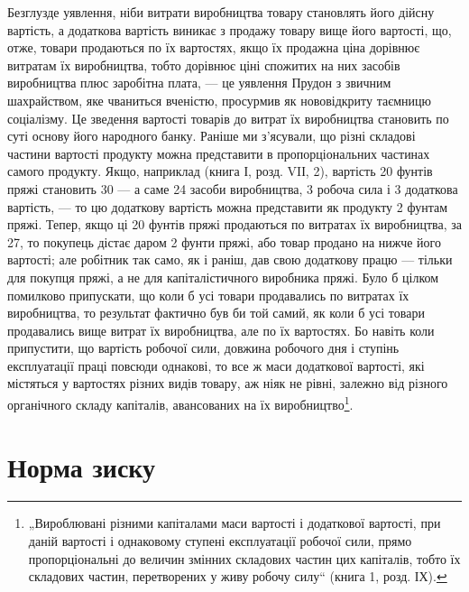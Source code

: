 
Безглузде уявлення, ніби витрати виробництва товару становлять
його дійсну вартість, а додаткова вартість виникає
з продажу товару вище його вартості, що, отже, товари продаються
по їх вартостях, якщо їх продажна ціна дорівнює витратам
їх виробництва, тобто дорівнює ціні спожитих на них
засобів виробництва плюс заробітна плата, — це уявлення Прудон
з звичним шахрайством, яке чваниться вченістю, просурмив
як нововідкриту таємницю соціалізму. Це зведення вартості
товарів до витрат їх виробництва становить по суті
основу його народного банку. Раніше ми з’ясували, що різні складові
частини вартості продукту можна представити в пропорціональних
частинах самого продукту. Якщо, наприклад (книга І,
розд. VIІ, 2), вартість 20 фунтів пряжі становить
30 — а саме 24 засоби виробництва, 3
робоча сила і 3 додаткова вартість, — то цю додаткову
вартість можна представити як  продукту \deq{} 2 фунтам пряжі.
Тепер, якщо ці 20 фунтів пряжі продаються по витратах їх
виробництва, за 27, то покупець дістає даром 2 фунти
пряжі, або товар продано на   нижче його вартості; але робітник
так само, як і раніш, дав свою додаткову працю — тільки
для покупця пряжі, а не для капіталістичного виробника пряжі.
Було б цілком помилково припускати, що коли б усі товари
продавались по витратах їх виробництва, то результат фактично
був би той самий, як коли б усі товари продавались вище витрат
їх виробництва, але по їх вартостях. Бо навіть коли припустити,
що вартість робочої сили, довжина робочого дня
і ступінь експлуатації праці повсюди однакові, то все ж маси
додаткової вартості, які містяться у вартостях різних видів
товару, аж ніяк не рівні, залежно від різного органічного складу
капіталів, авансованих на їх виробництво\footnote{
„Вироблювані різними капіталами маси вартості і додаткової вартості, при
даній вартості і однаковому ступені експлуатації робочої сили, прямо пропорціональні
до величин змінних складових частин цих капіталів, тобто їх складових
частин, перетворених у живу робочу силу“ (книга 1, розд. ІХ).
}.
\section{Норма зиску}

